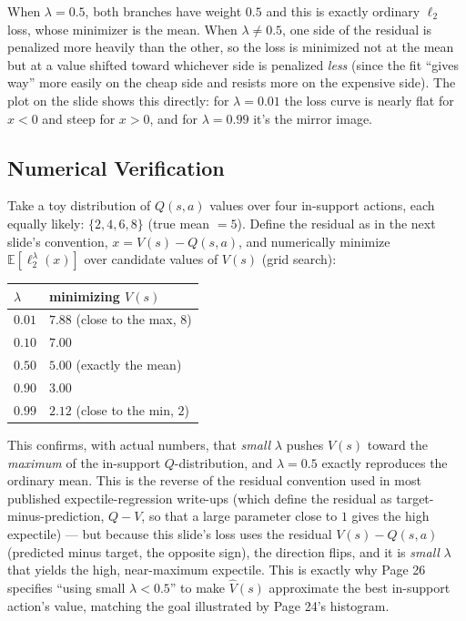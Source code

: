 \documentclass[11pt]{article}
\begin{document}
When $\lambda=0.5$, both branches have weight $0.5$ and this is exactly ordinary $\ell_2$ loss, whose minimizer is the mean. When $\lambda \ne 0.5$, one side of the residual is penalized more heavily than the other, so the loss is minimized not at the mean but at a value shifted toward whichever side is penalized \emph{less} (since the fit ``gives way'' more easily on the cheap side and resists more on the expensive side). The plot on the slide shows this directly: for $\lambda=0.01$ the loss curve is nearly flat for $x<0$ and steep for $x>0$, and for $\lambda=0.99$ it's the mirror image.

\subsection*{Numerical Verification}

Take a toy distribution of $Q(s,a)$ values over four in-support actions, each equally likely: $\{2,4,6,8\}$ (true mean $=5$). Define the residual as in the next slide's convention, $x = V(s) - Q(s,a)$, and numerically minimize $\mathbb{E}[\ell_2^\lambda(x)]$ over candidate values of $V(s)$ (grid search):
\begin{center}
\begin{tabular}{@{}ll@{}}
\toprule
$\lambda$ & minimizing $V(s)$ \\
\midrule
$0.01$ & $7.88$ (close to the max, $8$) \\
$0.10$ & $7.00$ \\
$0.50$ & $5.00$ (exactly the mean) \\
$0.90$ & $3.00$ \\
$0.99$ & $2.12$ (close to the min, $2$) \\
\bottomrule
\end{tabular}
\end{center}
This confirms, with actual numbers, that \emph{small} $\lambda$ pushes $V(s)$ toward the \emph{maximum} of the in-support $Q$-distribution, and $\lambda=0.5$ exactly reproduces the ordinary mean. This is the reverse of the residual convention used in most published expectile-regression write-ups (which define the residual as target-minus-prediction, $Q-V$, so that a large parameter close to $1$ gives the high expectile) --- but because this slide's loss uses the residual $V(s)-Q(s,a)$ (predicted minus target, the opposite sign), the direction flips, and it is \emph{small} $\lambda$ that yields the high, near-maximum expectile. This is exactly why Page 26 specifies ``using small $\lambda<0.5$'' to make $\hat V(s)$ approximate the best in-support action's value, matching the goal illustrated by Page 24's histogram.
\end{document}
